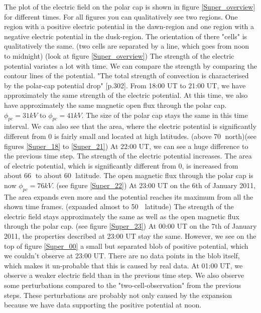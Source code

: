 \documentclass[10pt,a4paper]{article}
\begin{document}
The plot of the electric field on the polar cap is shown in figure \ref{Super_overview} for different times. For all figures you can qualitatively see two regions. One region with a positive electric potential in the dawn-region and one region with a negative electric potential in the dusk-region. The orientation of there "cells" is qualitatively the same. (two cells are separated by a line, which goes from noon to midnight) (look at figure \ref{Super_overview}) 
The strength of the electric potential variates a lot with time. We can compare the strength by comparing the contour lines of the potential. 
"The total strength of convection is characterised by the polar-cap potential drop" \cite{Buch2}[p.302]. From 18:00 UT to 21:00 UT, we have approximately the same 
strength of the electric potential. At this time, we also have approximately the same magnetic open flux through the polar cap. $\phi_{pc}=31kV$ to $\phi_{pc}=41 k V $. 
The size of the polar cap stays the same in this time interval. We can also see that the area, where the electric potential is significantly different from 0 is fairly small and located at high latitudes. (above 70\textdegree $
\;$ north)(see figures \ref{Super_18} to \ref{Super_21})
At 22:00 UT, we can see a huge difference to the previous time step. The strength of the electric potential increases. The area of electric potential, which is significantly different from 0, is increased from about 66\textdegree $\;$ to about 60\textdegree $\;$ latitude. The open magnetic flux through the polar cap is now $\phi_{pc}=76 k V$. (see figure \ref{Super_22})
At 23:00 UT on the 6th of January 2011, The area expands even more and the potential reaches its maximum from all the shown time frames. (expanded almost to 50 \textdegree $\;$ 
latitude) The strength of the electric field stays approximately the same as well as the open magnetic flux through the polar cap. (see figure \ref{Super_23})
At 00:00 UT on the 7th of January 2011, the properties described at 23:00 UT stay the same. However, we see on the top of figure \ref{Super_00} a small but 
separated blob of positive potential, which we couldn't observe at 23:00 UT. There are no data points in the blob itself, which makes it un-probable that this is caused by real data. 
At 01:00 UT, we observe a weaker electric field than in the previous time step. We also observe some perturbations compared to the  "two-cell-observation" from the 
previous steps. These perturbations are probably not only caused by the expansion because we have data supporting the positive potential at noon. 
\end{document}
